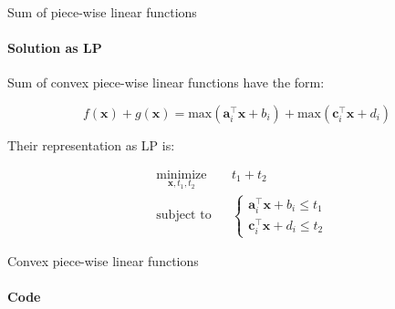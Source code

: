 \documentclass{beamer}
\begin{document}
\begin{frame}{Sum of piece-wise linear functions}
\framesubtitle{Solution as LP}
\begin{flushleft}


Sum of convex piece-wise linear functions have the form:

\begin{equation}
    f(\mathbf{x}) + g(\mathbf{x}) = \text{max}(\mathbf{a}_i^\top \mathbf{x} + b_i) +  \text{max}(\mathbf{c}_i^\top \mathbf{x} + d_i)
\end{equation}

\bigskip

Their representation as LP is:

\begin{equation}
\begin{aligned}
& \underset{\mathbf{x}, t_1, t_2}{\text{minimize}}
& & t_1 + t_2 \\
& \text{subject to}
& & \begin{cases}
\mathbf{a}_i^\top \mathbf{x} + b_i \leq t_1 \\
\mathbf{c}_i^\top \mathbf{x} + d_i \leq t_2
\end{cases}
%
\end{aligned}
\end{equation}


 
\end{flushleft}
\end{frame}




\begin{frame}{Convex piece-wise linear functions}
\framesubtitle{Code}
\begin{flushleft}


 
\end{flushleft}
\end{frame}



%		
%		
%	
%		
%		
\end{document}
